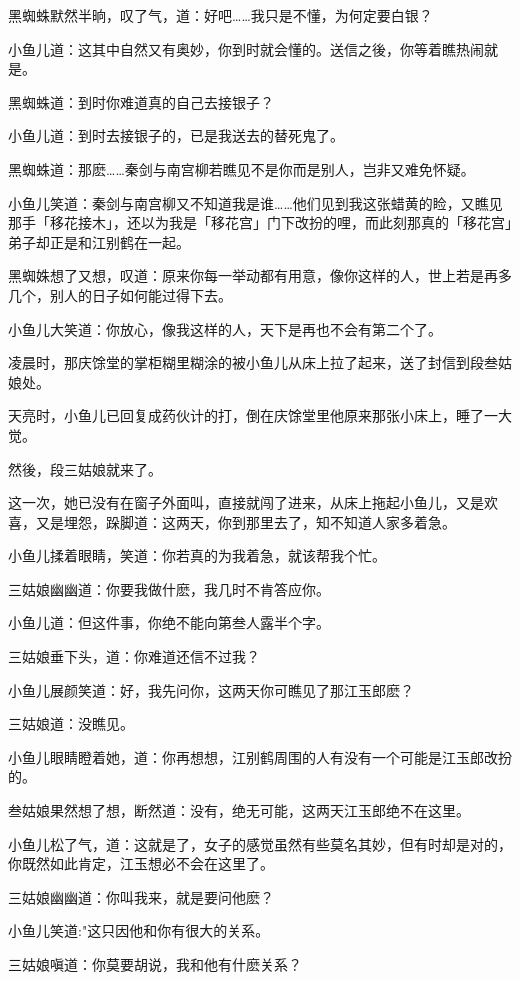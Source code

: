 \documentclass[12pt,oneside]{book}
\begin{document}
黑蜘蛛默然半晌，叹了气，道：好吧\ldots\ldots 我只是不懂，为何定要白银？

小鱼儿道：这其中自然又有奥妙，你到时就会懂的。送信之後，你等着瞧热闹就是。

黑蜘蛛道：到时你难道真的自己去接银子？

小鱼儿道：到时去接银子的，已是我送去的替死鬼了。

黑蜘蛛道：那麽\ldots\ldots 秦剑与南宫柳若瞧见不是你而是别人，岂非又难免怀疑。

小鱼儿笑道：秦剑与南宫柳又不知道我是谁\ldots\ldots 他们见到我这张蜡黄的睑，又瞧见那手「移花接木」，还以为我是「移花宫」门下改扮的哩，而此刻那真的「移花宫」弟子却正是和江别鹤在一起。

黑蜘姝想了又想，叹道：原来你每一举动都有用意，像你这样的人，世上若是再多几个，别人的日子如何能过得下去。

小鱼儿大笑道：你放心，像我这样的人，天下是再也不会有第二个了。

凌晨时，那庆馀堂的掌柜糊里糊涂的被小鱼儿从床上拉了起来，送了封信到段叁姑娘处。

天亮时，小鱼儿已回复成药伙计的打，倒在庆馀堂里他原来那张小床上，睡了一大觉。

然後，段三姑娘就来了。

这一次，她已没有在窗子外面叫，直接就闯了进来，从床上拖起小鱼儿，又是欢喜，又是埋怨，跺脚道：这两天，你到那里去了，知不知道人家多着急。

小鱼儿揉着眼睛，笑道：你若真的为我着急，就该帮我个忙。

三姑娘幽幽道：你要我做什麽，我几时不肯答应你。

小鱼儿道：但这件事，你绝不能向第叁人露半个字。

三姑娘垂下头，道：你难道还信不过我？

小鱼儿展颜笑道：好，我先问你，这两天你可瞧见了那江玉郎麽？

三姑娘道：没瞧见。

小鱼儿眼睛瞪着她，道：你再想想，江别鹤周围的人有没有一个可能是江玉郎改扮的。

叁姑娘果然想了想，断然道：没有，绝无可能，这两天江玉郎绝不在这里。

小鱼儿松了气，道：这就是了，女子的感觉虽然有些莫名其妙，但有时却是对的，你既然如此肯定，江玉想必不会在这里了。

三姑娘幽幽道：你叫我来，就是要问他麽？

小鱼儿笑道:"这只因他和你有很大的关系。

三姑娘嗔道：你莫要胡说，我和他有什麽关系？
\end{document}

